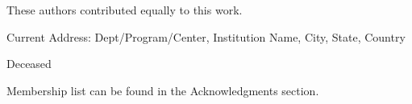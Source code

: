 \documentclass[
  10pt,
  letterpaper,
]{article}
\begin{document}
\vspace*{0.2in}

\begin{flushleft}
{\Large
\textbf{} %
}
\newline
\\

\\
\bigskip

\bigskip

% 
%
\Yinyang These authors contributed equally to this work.


\textcurrency Current Address: Dept/Program/Center, Institution Name, City, State, Country %

\dag Deceased

\textpilcrow Membership list can be found in the Acknowledgments section.


\end{flushleft}
\end{document}

